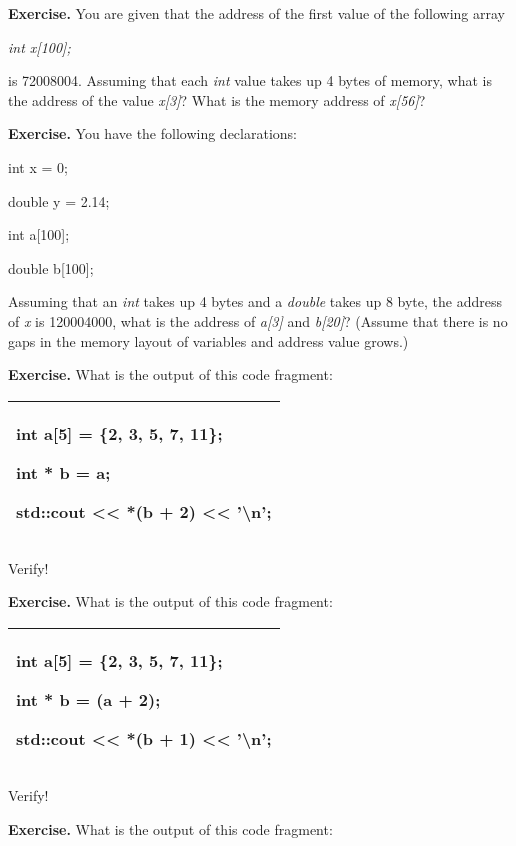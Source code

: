 \documentclass[
]{article}
\begin{document}
\textbf{Exercise.} You are given that the address of the first value of
the following array

\emph{int x{[}100{]};}

is 72008004. Assuming that each \emph{int} value takes up 4 bytes of
memory, what is the address of the value \emph{x{[}3{]}}? What is the
memory address of \emph{x{[}56{]}}?

\textbf{Exercise.} You have the following declarations:

int x = 0;

double y = 2.14;

int a{[}100{]};

double b{[}100{]};

Assuming that an \emph{int} takes up 4 bytes and a \emph{double} takes
up 8 byte, the address of \emph{x} is 120004000, what is the address of
\emph{a{[}3{]}} and \emph{b{[}20{]}}? (Assume that there is no gaps in
the memory layout of variables and address value grows.)

\textbf{Exercise.} What is the output of this code fragment:

\begin{longtable}[]{@{}l@{}}
\toprule
\endhead
\begin{minipage}[t]{0.97\columnwidth}\raggedright
int a{[}5{]} = \{2, 3, 5, 7, 11\};

int * b = a;

std::cout \textless\textless{} *(b + 2) \textless\textless{}
'\textbackslash n';\strut
\end{minipage}\tabularnewline
\bottomrule
\end{longtable}

Verify!

\textbf{Exercise.} What is the output of this code fragment:

\begin{longtable}[]{@{}l@{}}
\toprule
\endhead
\begin{minipage}[t]{0.97\columnwidth}\raggedright
int a{[}5{]} = \{2, 3, 5, 7, 11\};

int * b = (a + 2);

std::cout \textless\textless{} *(b + 1) \textless\textless{}
'\textbackslash n';\strut
\end{minipage}\tabularnewline
\bottomrule
\end{longtable}

Verify!

\textbf{Exercise.} What is the output of this code fragment:
\end{document}
